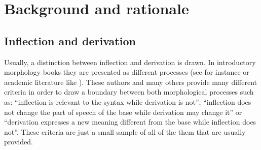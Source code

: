 \documentclass[12pt]{article}
\begin{document}



\section{Background and rationale}

\subsection{Inflection and derivation}
Usually, a distinction between inflection and derivation is drawn. In introductory morphology books they are presented as different processes (see for instance \textcite{aronoff2011WhatMorphology, booij2012GrammarWordsIntroduction,haspelmath2013UnderstandingMorphology} or academic literature like \textcite{booij2006InflectionDerivation,stump2005WordFormationInflectionalMorphology,stump2017Inflection}). These authors and many others provide many different criteria in order to draw a boundary between both morphological processes such as: \enquote{inflection is relevant to the syntax while derivation is not}, \enquote{inflection does not change the part of speech of the base while derivation may change it} or \enquote{derivation expresses a new meaning different from the base while inflection does not}. These criteria are just a small sample of all of the them that are usually provided. %
\end{document}

